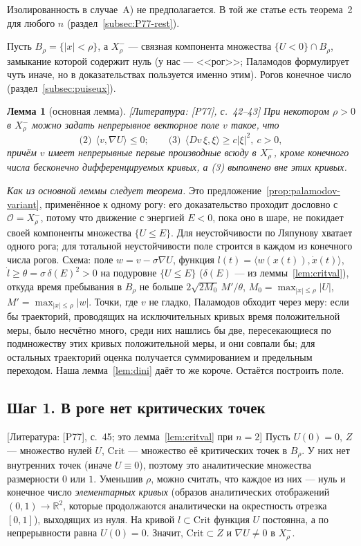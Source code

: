 \documentclass[11pt,a4paper]{article}
\newtheorem{lemma}[theorem]{Лемма}
\theoremstyle{definition}
\newcommand{\R}{\mathbb R}
\newcommand{\mk}[1]{\textsf{[#1]}}
\newcommand{\term}[1]{\emph{#1}}
\begin{document}
Изолированность в случае~A) не предполагается. В той же статье есть теорема~2 для любого $n$
(раздел~\ref{subsec:P77-rest}).

Пусть $B_\rho=\{|x|<\rho\}$, а $X^-_\rho$ --- связная компонента множества $\{U<0\}\cap B_\rho$,
замыкание которой содержит нуль (у нас --- <<рог>>; Паламодов формулирует чуть иначе, но в
доказательствах пользуется именно этим). Рогов конечное число (раздел~\ref{subsec:puiseux}).

\begin{lemma}[основная лемма]\label{lem:P77main}
\mk{Литература: [P77], с.~42--43} При некотором $\rho>0$ в $X^-_\rho$ можно задать
непрерывное векторное поле $v$ такое, что
\[
\text{(2)}\ \ \langle v,\nabla U\rangle\le0;\qquad\text{(3)}\ \ \langle Dv\,\xi,\xi\rangle\ge c|\xi|^2,\ c>0,
\]
причём $v$ имеет непрерывные первые производные всюду в $X^-_\rho$, кроме конечного числа
бесконечно дифференцируемых кривых, а (3) выполнено вне этих кривых.
\end{lemma}

\emph{Как из основной леммы следует теорема.} Это предложение~\ref{prop:palamodov-variant},
применённое к одному рогу: его доказательство проходит дословно с $\mathcal O=X^-_\rho$, потому что
движение с энергией $E<0$, пока оно в шаре, не покидает своей компоненты множества $\{U\le E\}$.
Для неустойчивости по Ляпунову хватает одного рога; для тотальной неустойчивости поле строится в
каждом из конечного числа рогов. Схема: поле $w=v-\sigma\nabla U$, функция
$l(t)=\langle w(x(t)),\dot x(t)\rangle$, $\dot l\ge\theta=\sigma\,\delta(E)^2>0$ на подуровне
$\{U\le E\}$ ($\delta(E)$ --- из леммы~\ref{lem:critval}), откуда время пребывания в $B_\rho$ не больше
$2\sqrt{2M_0}\,M'/\theta$, $M_0=\max_{|x|\le\rho}|U|$, $M'=\max_{|x|\le\rho}|w|$. Точки, где $v$ не
гладко, Паламодов обходит через меру: если бы траекторий, проводящих на исключительных кривых
время положительной меры, было несчётно много, среди них нашлись бы две, пересекающиеся по
подмножеству этих кривых положительной меры, и они совпали бы; для остальных траекторий оценка
получается суммированием и предельным переходом. Наша лемма~\ref{lem:dini} даёт то же короче. Остаётся
построить поле.

\subsection{Шаг 1. В роге нет критических точек}

\mk{Литература: [P77], с.~45; это лемма~\ref{lem:critval} при $n=2$} Пусть $U(0)=0$, $Z$ ---
множество нулей $U$, $\mathrm{Crit}$ --- множество её критических точек в $B_\rho$. У них нет внутренних точек
(иначе $U\equiv0$), поэтому это аналитические множества размерности $0$ или $1$. Уменьшив
$\rho$, можно считать, что каждое из них --- нуль и конечное число \term{элементарных кривых}
(образов аналитических отображений $(0,1)\to\R^2$, которые продолжаются аналитически на
окрестность отрезка $[0,1]$), выходящих из нуля. На кривой $l\subset\mathrm{Crit}$ функция $U$
постоянна, а по непрерывности равна $U(0)=0$. Значит, $\mathrm{Crit}\subset Z$ и $\nabla U\ne0$ в $X^-_\rho$.
\end{document}
